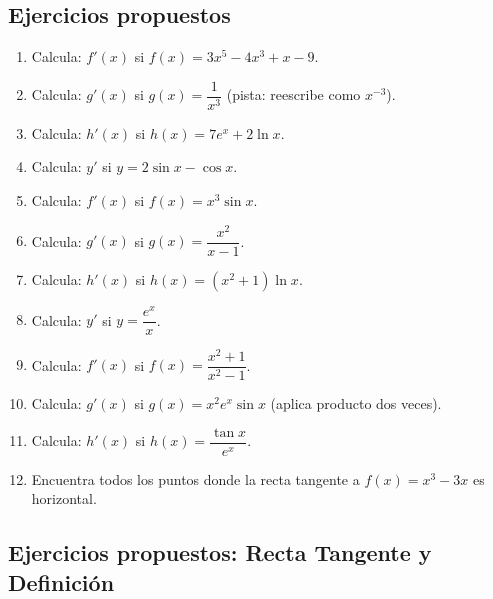 \documentclass[12pt, letterpaper]{article}
\begin{document}
\newpage

\subsection{Ejercicios propuestos}

\begin{enumerate}[resume=ejercicios, leftmargin=*]
  \item \facil{} Calcula: $f'(x)$ si $f(x) = 3x^5 - 4x^3 + x - 9$.
  \item \facil{} Calcula: $g'(x)$ si $g(x) = \dfrac{1}{x^3}$ (pista: reescribe como $x^{-3}$).
  \item \facil{} Calcula: $h'(x)$ si $h(x) = 7e^x + 2\ln x$.
  \item \facil{} Calcula: $y'$ si $y = 2\sin x - \cos x$.
  \item \medio{} Calcula: $f'(x)$ si $f(x) = x^3 \sin x$.
  \item \medio{} Calcula: $g'(x)$ si $g(x) = \dfrac{x^2}{x - 1}$.
  \item \medio{} Calcula: $h'(x)$ si $h(x) = (x^2 + 1) \ln x$.
  \item \medio{} Calcula: $y'$ si $y = \dfrac{e^x}{x}$.
  \item \dificil{} Calcula: $f'(x)$ si $f(x) = \dfrac{x^2 + 1}{x^2 - 1}$.
  \item \dificil{} Calcula: $g'(x)$ si $g(x) = x^2 e^x \sin x$ (aplica producto dos veces).
  \item \dificil{} Calcula: $h'(x)$ si $h(x) = \dfrac{\tan x}{e^x}$.
  \item \dificil{} Encuentra todos los puntos donde la recta tangente a $f(x) = x^3 - 3x$ es horizontal.
\end{enumerate}


\subsection{Ejercicios propuestos: Recta Tangente y Definición}
\end{document}
